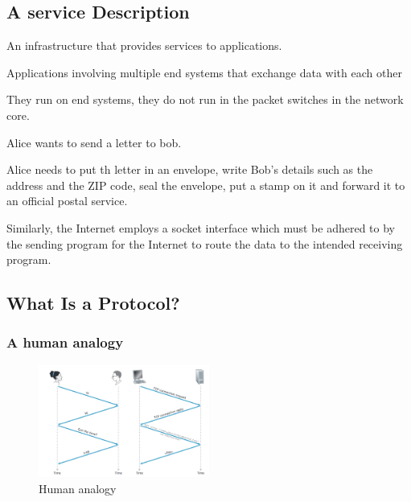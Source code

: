 
\subsection{A service Description}

\begin{definition}\label{def:a_service_description_1}
    An infrastructure that provides services to applications.
\end{definition}

\begin{definition*}
    Applications involving multiple end systems that exchange data with each 
    other
    
    \begin{remark}
        They run on end systems, they do not run in the packet switches in the 
        network core.
    \end{remark}
    
\end{definition*}


\begin{note}\label{note:postal_service_analogy_1}
    Alice wants to send a letter to bob.

    Alice needs to put th letter in an envelope, write Bob's details such as
    the address and the ZIP code, seal the envelope, put a stamp on it and 
    forward it to an official postal service.

    Similarly, the Internet employs a socket interface which must be adhered to 
    by the sending program for the Internet to route the data to the intended 
    receiving program.
\end{note}

\subsection{What Is a Protocol?}

\subsubsection{A human analogy}

\begin{figure}[h]
    \caption{Human analogy}
    \label{fig:human_analogy_1}
    \centering\includegraphics[width=0.5\textwidth]
    {Figures/lec_2_human_analogy.png}
\end{figure}



\newpage













